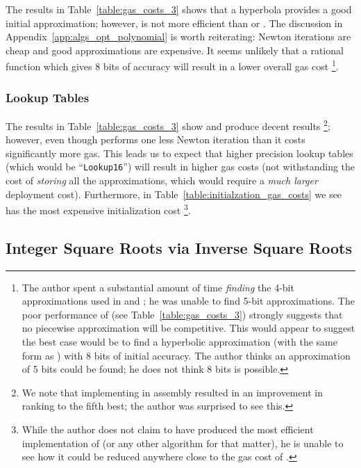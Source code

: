 The results \HyperFour{} in Table~\ref{table:gas_costs_3}
shows that a hyperbola provides a good initial approximation;
however, \HyperFour{} is not more efficient than \UnrolledThree{}
or \Linear{}.
The discussion in Appendix~\ref{app:algs_opt_polynomial} is worth reiterating:
Newton iterations are cheap and good approximations are expensive.
It seems unlikely that a rational function which gives 8 bits of accuracy
will result in a lower overall gas cost%
\footnote{The author spent a substantial amount of time \emph{finding}
the 4-bit approximations used in \Linear{} and \HyperFour{};
he was unable to find 5-bit approximations.
The poor performance of \BitLength{} (see Table~\ref{table:gas_costs_3})
strongly suggests that no piecewise approximation will be competitive.
This would appear to suggest the best case would be to find
a hyperbolic approximation (with the same form as \HyperFour{})
with 8 bits of initial accuracy.
The author thinks an approximation of 5 bits could be found;
he does not think 8 bits is possible.}.

\subsubsection{Lookup Tables}
\label{app:algs_opt_lookup}

The results in Table~\ref{table:gas_costs_3}
show \LookupFour{} and \LookupEight{} produce decent results%
\footnote{We note that implementing \LookupFour{} in assembly
resulted in an improvement in ranking to the fifth best;
the author was surprised to see this.};
however, even though \LookupEight{}
performs one less Newton iteration than \LookupFour{}
it costs significantly more gas.
This leads us to expect that higher precision
lookup tables (which would be ``\texttt{Lookup16}'')
will result in higher gas costs
(not withstanding the cost of \emph{storing} all the approximations,
which would require a \emph{much larger} deployment cost).
Furthermore, in Table~\ref{table:initialzation_gas_costs}
we see \LookupEight{} has
the most expensive initialization cost%
\footnote{While the author does not claim to have produced the
most efficient implementation of \LookupEight{}
(or any other algorithm for that matter),
he is unable to see how it could be reduced anywhere close
to the gas cost of \LookupFour{}.}.


\subsection{Integer Square Roots via Inverse Square Roots}

